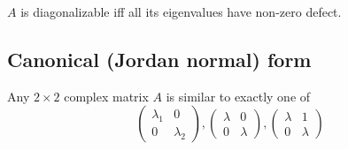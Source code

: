 \documentclass[a4paper]{article}
\begin{document}
\begin{prop}
  $A$ is diagonalizable iff all its eigenvalues have non-zero defect.
\end{prop}
\subsection{Canonical (Jordan normal) form}
\begin{thm}
  Any $2\times 2$ complex matrix $A$ is similar to exactly one of
  \[
  \begin{pmatrix}
    \lambda_1 & 0\\
    0 & \lambda_2
  \end{pmatrix},
  \begin{pmatrix}
    \lambda & 0\\
    0 & \lambda
  \end{pmatrix},
  \begin{pmatrix}
    \lambda & 1\\
    0 & \lambda
  \end{pmatrix}
  \]
\end{thm}
\end{document}
